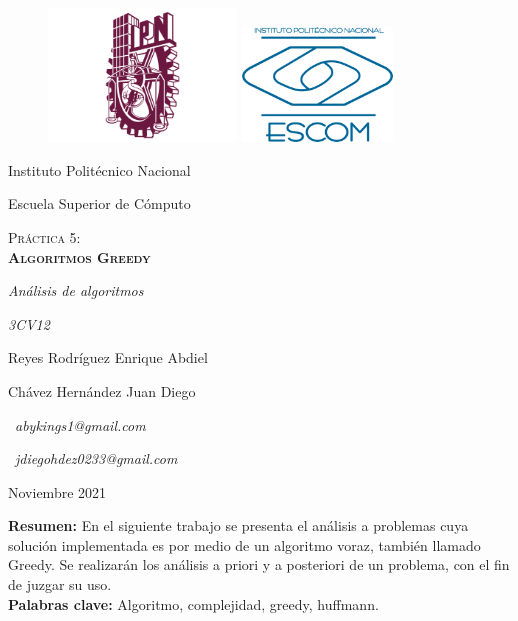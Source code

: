 \documentclass{article}
\begin{document}
\begin{titlepage}
        \begin{figure}
            \vspace{-8 em}
            \hspace{-10 em}
            \includegraphics[width=5cm]{ipn} \hfill \includegraphics[width=4cm]{escom}
            \hspace{-8 em}
        \end{figure}
        \begin{center}
            {\large Instituto Politécnico Nacional \par}
            {\Large Escuela Superior de Cómputo \par}
            \vspace{3cm}
            {\scshape\Huge Práctica 5:\\ \bfseries Algoritmos Greedy \par}
            \vspace{3cm}
            {\itshape\Large Análisis de algoritmos \par}
            {\itshape\Large 3CV12 \par}
            \vfill
            {\Large Reyes Rodríguez Enrique Abdiel \par}
            {\Large Chávez Hernández Juan Diego \par}
            \vfill
            {\ \textit{abykings1@gmail.com} \par}
            {\ \textit{jdiegohdez0233@gmail.com} \par}
            \vfill
            {\Large Noviembre 2021\par}
        \end{center}
    \end{titlepage}
\newpage

    \textbf{Resumen: }
     En el siguiente trabajo se presenta el análisis a problemas cuya solución implementada es por medio de un algoritmo voraz, también llamado Greedy. Se realizarán los análisis a priori y a posteriori de un problema, con el fin de juzgar su uso.\\
    \textbf{Palabras clave: } Algoritmo, complejidad, greedy, huffmann.
\end{document}

